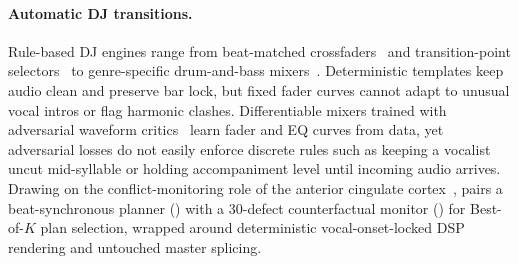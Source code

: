 \paragraph{Automatic DJ transitions.}
Rule-based DJ engines range from beat-matched crossfaders~\citep{cliff2000hang} and transition-point selectors~\citep{bittner2017automatic} to genre-specific drum-and-bass mixers~\citep{vandeveire2018raw}. Deterministic templates keep audio clean and preserve bar lock, but fixed fader curves cannot adapt to unusual vocal intros or flag harmonic clashes. Differentiable mixers trained with adversarial waveform critics~\citep{chen2022automatic} learn fader and EQ curves from data, yet adversarial losses do not easily enforce discrete rules such as keeping a vocalist uncut mid-syllable or holding accompaniment level until incoming audio arrives. Drawing on the conflict-monitoring role of the anterior cingulate cortex~\citep{botvinick2001conflict}, \sone{} pairs a beat-synchronous planner () with a $30$-defect counterfactual monitor () for Best-of-$K$ plan selection, wrapped around deterministic vocal-onset-locked DSP rendering and untouched master splicing.

